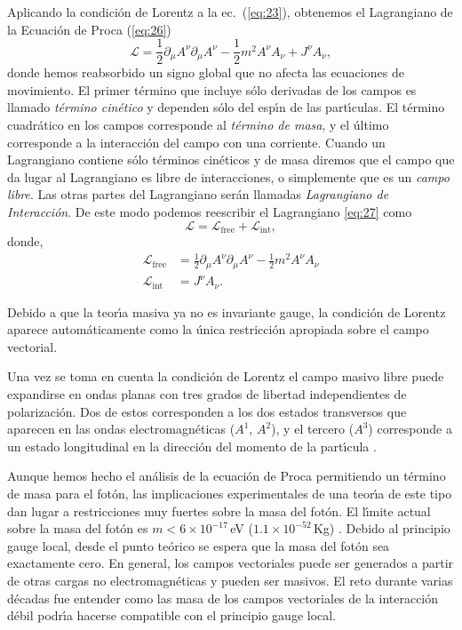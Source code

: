 \begin{frame}
Aplicando la condici\'on de Lorentz a la ec.~(\ref{eq:23}), obtenemos el
Lagrangiano de la Ecuaci\'on de Proca (\ref{eq:26})
\begin{equation}
  \label{eq:27}
  \mathcal{L}=\frac{1}{2}\partial_\mu A^\nu\partial_\mu A^\nu-\frac{1}{2} m^2A^\nu A_\nu+J^\nu A_\nu,
\end{equation}
donde hemos reabsorbido un signo global que no afecta las ecuaciones
de movimiento. El primer t\'ermino que incluye s\'olo derivadas de los
campos es llamado \emph{t\'ermino cin\'etico} y dependen s\'olo del esp\'\i n de
las part\'\i culas. El t\'ermino cuadr\'atico en
los campos corresponde al \emph{t\'ermino de masa}, y el \'ultimo
corresponde a la interacci\'on del campo con una corriente. Cuando un
Lagrangiano contiene s\'olo t\'erminos cin\'eticos y de masa diremos que el
campo que da lugar al Lagrangiano es libre de interacciones, o
simplemente que es un \emph{campo libre}. Las otras partes del
Lagrangiano ser\'an llamadas \emph{Lagrangiano de Interacci\'on}. De este
modo podemos reescribir el Lagrangiano \eqref{eq:27} como
\begin{equation*}
\mathcal{L}=\mathcal{L}_{\text{free}}+\mathcal{L}_{\text{int}},  
\end{equation*}
donde,
\begin{align}
\mathcal{L}_{\text{free}}&=\frac{1}{2}\partial_\mu A^\nu\partial_\mu A^\nu-\frac{1}{2} m^2A^\nu A_\nu\nonumber\\
\label{eq:28}
\mathcal{L}_{\text{int}}&=J^\nu A_\nu.
\end{align}

Debido a que la teor\'\i a masiva ya no es invariante gauge, la condici\'on
de Lorentz aparece autom\'aticamente como la \'unica restricci\'on apropiada
sobre el campo vectorial.

Una vez se toma en cuenta la condici\'on de Lorentz el campo masivo
libre puede expandirse en ondas planas con tres grados de libertad
independientes de polarizaci\'on. Dos de estos corresponden a los dos
estados transversos que aparecen en las ondas electromagn\'eticas
($A^1$, $A^2$), y el tercero ($A^3$) corresponde a un estado
longitudinal en la direcci\'on del momento de la part\'\i cula \cite{Gross}.

Aunque hemos hecho el an\'alisis de la ecuaci\'on de Proca permitiendo un
t\'ermino de masa para el fot\'on, las implicaciones experimentales de una
teor\'\i a de este tipo dan lugar a restricciones muy fuertes sobre la
masa del fot\'on\cite{Goldhaber:1971mr}. El l\'\i mite actual sobre la masa
del fot\'on es $m\lt 6\times10^{-17}\,$eV ($1.1\times10^{-52}\,$Kg)
\cite{Yao:2006px}. Debido al principio gauge local, desde el punto
te\'orico se espera que la masa del fot\'on sea exactamente cero. En
general, los campos vectoriales puede ser generados a partir de otras
cargas no electromagn\'eticas y pueden ser masivos. El reto durante
varias d\'ecadas fue entender como las masa de los campos vectoriales de
la interacci\'on d\'ebil podr\'\i a hacerse compatible con el principio gauge
local.  
\end{frame}





